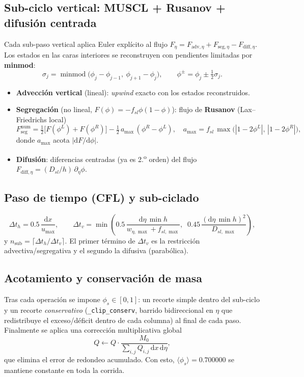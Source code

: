 \documentclass[11pt,a4paper]{article}
\newcommand{\dd}{\mathrm{d}}
\begin{document}
\subsection{Sub-ciclo vertical: MUSCL + Rusanov + difusión centrada}
Cada sub-paso vertical aplica Euler explícito al flujo
$F_\eta=F_{\mathrm{adv},\eta}+F_{\mathrm{seg},\eta}-F_{\mathrm{diff},\eta}$.
Los estados en las caras interiores se reconstruyen con pendientes
limitadas por \textbf{minmod}:
\begin{equation}
    \sigma_j = \operatorname{minmod}\!\big(\phi_j-\phi_{j-1},\ \phi_{j+1}-\phi_j\big),
    \qquad
    \phi^{\pm} = \phi_j \pm \tfrac12\sigma_j .
\end{equation}
\begin{itemize}
    \item \textbf{Advección vertical} (lineal): \emph{upwind} exacto con los
    estados reconstruidos.
    \item \textbf{Segregación} (no lineal, $F(\phi)=-f_{sl}\phi(1-\phi)$):
    flujo de \textbf{Rusanov} (Lax--Friedrichs local)
    \begin{equation}
        F^{\mathrm{num}}_{\mathrm{seg}} = \tfrac12\big[F(\phi^L)+F(\phi^R)\big]
        - \tfrac12\,a_{\max}\,(\phi^R-\phi^L),
        \quad
        a_{\max} = f_{sl}\,\max\!\big(|1-2\phi^L|,\,|1-2\phi^R|\big),
    \end{equation}
    donde $a_{\max}$ acota $|\dd F/\dd\phi|$.
    \item \textbf{Difusión}: diferencias centradas (ya es 2.\textsuperscript{o}
    orden) del flujo $F_{\mathrm{diff},\eta}=(D_{sl}/h)\,\partial_\eta\phi$.
\end{itemize}

\subsection{Paso de tiempo (CFL) y sub-ciclado}
\begin{equation}
    \Delta t_h = 0.5\,\frac{\dd x}{u_{\max}},
    \qquad
    \Delta t_v = \min\!\left(
    0.5\,\frac{\dd\eta\,\min h}{w_{\eta,\max}+f_{sl,\max}},\;\;
    0.45\,\frac{(\dd\eta\,\min h)^2}{D_{sl,\max}}\right),
\end{equation}
y $n_{\mathrm{sub}}=\lceil \Delta t_h/\Delta t_v\rceil$. El primer término
de $\Delta t_v$ es la restricción advectiva/segregativa y el segundo la
difusiva (parabólica).

\subsection{Acotamiento y conservación de masa}
Tras cada operación se impone $\phi_s\in[0,1]$: un recorte simple dentro
del sub-ciclo y un recorte \emph{conservativo} (\texttt{\_clip\_conserv},
barrido bidireccional en $\eta$ que redistribuye el exceso/déficit dentro
de cada columna) al final de cada paso. Finalmente se aplica una
corrección multiplicativa global
\begin{equation}
    Q \leftarrow Q\cdot \frac{M_0}{\sum_{i,j}Q_{i,j}\,\dd x\,\dd\eta},
\end{equation}
que elimina el error de redondeo acumulado. Con esto,
$\langle\phi_s\rangle=0.700000$ se mantiene constante en toda la corrida.
\end{document}
